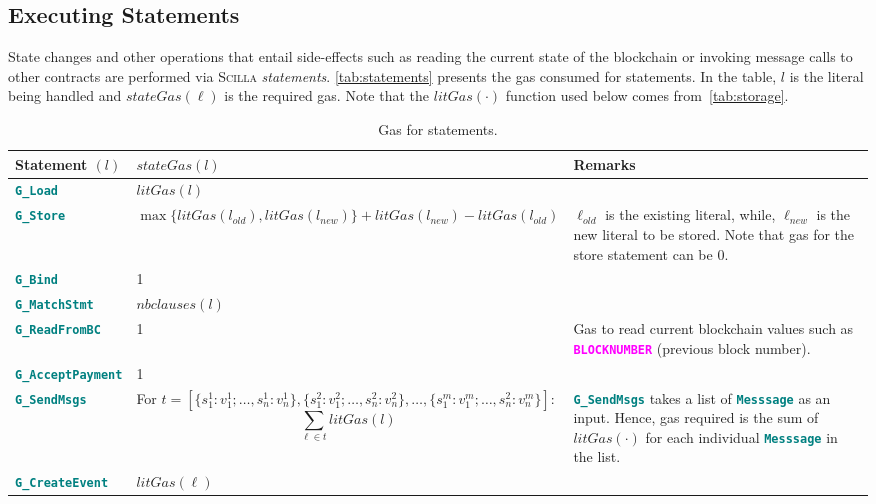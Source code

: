 \documentclass[9pt]{article}
\begin{document}
\subsection{Executing Statements}

State changes and other operations that entail side-effects such as reading the
current state of the blockchain or invoking message calls to other contracts
are performed via \textsc{Scilla} \emph{statements}. \autoref{tab:statements}
presents the gas consumed for statements. In the table, $l$ is the literal
being handled and $stateGas(\ell)$ is the required gas. Note that the
$litGas(\cdot)$ function used below comes from~\autoref{tab:storage}.

\begin{table}[!hbt]
	\caption{Gas for statements. \label{tab:statements} }
\centering
	\begin{tabular}{|l|p{8cm}|p{4cm}|}
	\hline
		\textbf{Statement $(l)$} & \textbf{$stateGas(l)$} & \textbf{Remarks} \\ \hline
		\textbf{\texttt{\textcolor{teal}{G\_Load}}}  & $litGas(l)$  & \\ \hline
		\textbf{\texttt{\textcolor{teal}{G\_Store}}}  & $\max\{litGas(l_{old}),
		litGas(l_{new})\} + litGas(l_{new}) -
		litGas(l_{old})$  & $\ell_{old}$ is the existing literal, while, $\ell_{new}$ is the
		new literal to be stored. Note that gas for the store statement can be 0.  \\ \hline
		\textbf{\texttt{\textcolor{teal}{G\_Bind}}}  & 1 & \\ \hline
		\textbf{\texttt{\textcolor{teal}{G\_MatchStmt}}}  & $nbclauses(l)$  & \\ \hline
		\textbf{\texttt{\textcolor{teal}{G\_ReadFromBC}}}  & 1  & Gas to read
		current blockchain values such as
		\textbf{\textcolor{magenta}{\texttt{BLOCKNUMBER}}} (previous block
		number).  \\ \hline
		\textbf{\texttt{\textcolor{teal}{G\_AcceptPayment}}}  & 1  & \\ \hline
		\textbf{\texttt{\textcolor{teal}{G\_SendMsgs}}}  & For $t = [\{s_{1}^{1} :
		v_{1}^{1}; \ldots, s_n^1 : v_n^1\}, \{s_1^2 : v_1^2; \ldots, s_n^2 :
		v_n^2\}, \ldots, \{s_1^m : v_1^m; \ldots, s_n^2 : v_n^m\}] $: $$
		\sum_{\ell \in t} litGas(l) $$ &
		\textbf{\texttt{\textcolor{teal}{G\_SendMsgs}}} takes a list of
		\textbf{\texttt{\textcolor{teal}{Messsage}}} as an input. Hence, gas
		required  is the sum of $litGas(\cdot)$ for each individual
		\textbf{\texttt{\textcolor{teal}{Messsage}}} in the list. \\ \hline
		\textbf{\texttt{\textcolor{teal}{G\_CreateEvent}}}  & $litGas(\ell)$ & \\ \hline
	\end{tabular}
\end{table}
\end{document}
